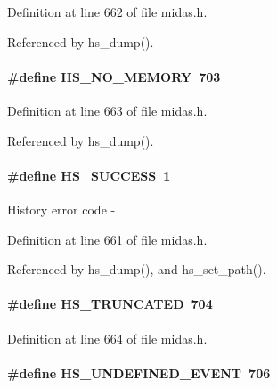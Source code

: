 \begin{DoxyItemize}
\item 
\end{DoxyItemize}

Definition at line 662 of file midas.h.

Referenced by hs\_\-dump().
\paragraph[{HS\_\-NO\_\-MEMORY}]{\setlength{\rightskip}{0pt plus 5cm}\#define HS\_\-NO\_\-MEMORY~703}\hfill\label{group__err26_ga8d2556d6b5d8902646a36e3aa7e71dc5}

\begin{DoxyItemize}
\item 
\end{DoxyItemize}

Definition at line 663 of file midas.h.

Referenced by hs\_\-dump().
\paragraph[{HS\_\-SUCCESS}]{\setlength{\rightskip}{0pt plus 5cm}\#define HS\_\-SUCCESS~1}\hfill\label{group__err26_ga2d533509db8628a7e0eb794e2b3e77b0}
History error code -\/ 

Definition at line 661 of file midas.h.

Referenced by hs\_\-dump(), and hs\_\-set\_\-path().
\paragraph[{HS\_\-TRUNCATED}]{\setlength{\rightskip}{0pt plus 5cm}\#define HS\_\-TRUNCATED~704}\hfill\label{group__err26_ga8b8cfc047a951f9afe9f833484d7e814}

\begin{DoxyItemize}
\item 
\end{DoxyItemize}

Definition at line 664 of file midas.h.
\paragraph[{HS\_\-UNDEFINED\_\-EVENT}]{\setlength{\rightskip}{0pt plus 5cm}\#define HS\_\-UNDEFINED\_\-EVENT~706}\hfill\label{group__err26_gad7b85d13f7ee77c6d195ed38380bbc27}

